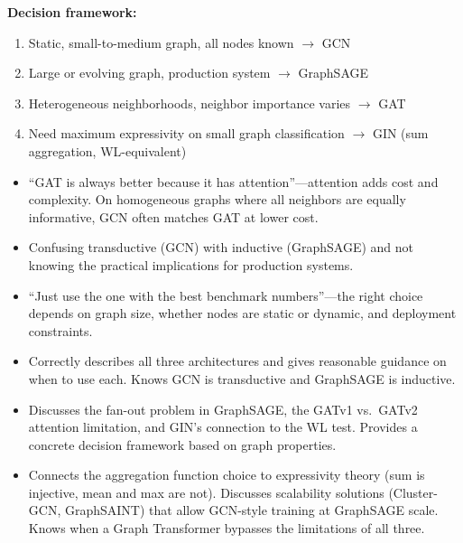 \begin{interviewq}
\textbf{Decision framework:}
\begin{enumerate}
    \item Static, small-to-medium graph, all nodes known $\to$ GCN
    \item Large or evolving graph, production system $\to$ GraphSAGE
    \item Heterogeneous neighborhoods, neighbor importance varies $\to$ GAT
    \item Need maximum expressivity on small graph classification $\to$ GIN (sum aggregation, WL-equivalent)
\end{enumerate}

\redflags
\begin{itemize}
    \item ``GAT is always better because it has attention''---attention adds cost and complexity. On homogeneous graphs where all neighbors are equally informative, GCN often matches GAT at lower cost.
    \item Confusing transductive (GCN) with inductive (GraphSAGE) and not knowing the practical implications for production systems.
    \item ``Just use the one with the best benchmark numbers''---the right choice depends on graph size, whether nodes are static or dynamic, and deployment constraints.
\end{itemize}


\goodgreat
\begin{itemize}
    \item {} Correctly describes all three architectures and gives reasonable guidance on when to use each. Knows GCN is transductive and GraphSAGE is inductive.
    \item {} Discusses the fan-out problem in GraphSAGE, the GATv1 vs.\ GATv2 attention limitation, and GIN's connection to the WL test. Provides a concrete decision framework based on graph properties.
    \item {} Connects the aggregation function choice to expressivity theory (sum is injective, mean and max are not). Discusses scalability solutions (Cluster-GCN, GraphSAINT) that allow GCN-style training at GraphSAGE scale. Knows when a Graph Transformer bypasses the limitations of all three.
\end{itemize}

\end{interviewq}

